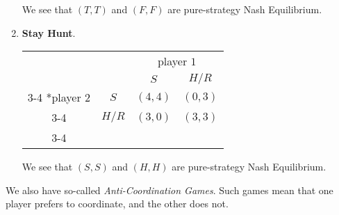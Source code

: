 \begin{eg}
\begin{enumerate}
\begin{table}[H]
		      \end{table}
		      We see that \((T, T)\) and \((F, F)\) are pure-strategy Nash Equilibrium.
		\item \textbf{Stay Hunt}.
		      \begin{table}[H]
			      \centering
			      \setlength{\extrarowheight}{2pt}
			      \begin{tabular}{cc|c|c|}
				                                & \multicolumn{1}{c}{} & \multicolumn{2}{c}{player $1$}                             \\
				                                & \multicolumn{1}{c}{} & \multicolumn{1}{c}{$S$}        & \multicolumn{1}{c}{$H/R$} \\\cline{3-4}
				      \multirow{2}*{player $2$} & $S$                  & $(4, 4)$                       & $(0, 3)$                  \\\cline{3-4}
				                                & $H/R$                & $(3, 0)$                       & $(3, 3)$                  \\\cline{3-4}
			      \end{tabular}
		      \end{table}
		      We see that \((S, S)\) and \((H, H)\) are pure-strategy Nash Equilibrium.
	\end{enumerate}
\end{eg}

\hr

We also have so-called \emph{Anti-Coordination Games}. Such games mean that one player prefers to coordinate, and the other does not.

